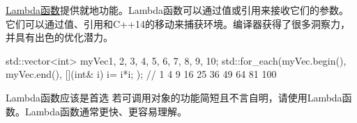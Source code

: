 \href{http://en.cppreference.com/w/cpp/language/lambda}{Lambda函数}提供就地功能。Lambda函数可以通过值或引用来接收它们的参数。它们可以通过值、引用和C++14的移动来捕获环境。编译器获得了很多洞察力，并具有出色的优化潜力。

\begin{cpp}
std::vector<int> myVec{1, 2, 3, 4, 5, 6, 7, 8, 9, 10};
std::for_each(myVec.begin(), myVec.end(), [](int& i){ i= i*i; });
									// 1 4 9 16 25 36 49 64 81 100
\end{cpp}

\begin{myTip}{Lambda函数应该是首选}
若可调用对象的功能简短且不言自明，请使用Lambda函数。Lambda函数通常更快、更容易理解。
\end{myTip}












